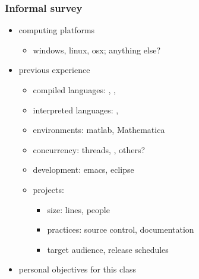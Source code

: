\begin{frame}[fragile]
%
  \frametitle{Informal survey}
%
  \begin{itemize}
%
  \item computing platforms
    \begin{itemize}
      \item windows, linux, osx; anything else?
    \end{itemize}
%
  \item previous experience
    \begin{itemize}
      \item compiled languages: \cc, \cpp, \fortran
      \item interpreted languages: \python, \perl
      \item environments: matlab, Mathematica
      \item concurrency: threads, \mpi, others?
      \item development: emacs, eclipse
      \item projects:
        \begin{itemize}
        \item size: lines, people
        \item practices: source control, documentation
        \item target audience, release schedules
        \end{itemize}
    \end{itemize}
%
  \item personal objectives for this class
%
  \end{itemize}
%
\end{frame}

